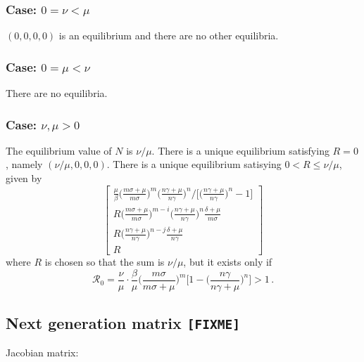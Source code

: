 \documentclass[fleqn]{article}
\begin{document}
\subsubsection{Case: $0 = \nu < \mu$}

$(0, 0, 0, 0)$ is an equilibrium and there are no other equilibria.

\subsubsection{Case: $0 = \mu < \nu$}

There are no equilibria.

\subsubsection{Case: $\nu, \mu > 0$}

The equilibrium value of $N$ is $\nu / \mu$.
There is a unique equilibrium satisfying $R = 0$,
namely $(\nu / \mu, 0, 0, 0)$.
There is a unique equilibrium satisying $0 < R \leq \nu / \mu$, given by
\begin{equation}
\begin{bmatrix}
  \left.\frac{\mu}{\beta} \big(\frac{m \sigma + \mu}{m \sigma}\big)^{m} \big(\frac{n \gamma + \mu}{n \gamma}\big)^{n} \big/ \big[\big(\frac{n \gamma + \mu}{n \gamma}\big)^{n} - 1\big]\right. \\
  R \big(\frac{m \sigma + \mu}{m \sigma}\big)^{m - i} \big(\frac{n \gamma + \mu}{n \gamma}\big)^{n} \frac{\delta + \mu}{m \sigma} \\
  R \big(\frac{n \gamma + \mu}{n \gamma}\big)^{n - j} \frac{\delta + \mu}{n \gamma} \\
  R
\end{bmatrix}
\end{equation}
where $R$ is chosen so that the sum is $\nu / \mu$, but it exists only if
\begin{equation}
\mathcal{R}_{0} = \frac{\nu}{\mu} \cdot \frac{\beta}{\mu} \Big(\frac{m \sigma}{m \sigma + \mu}\Big)^{m} \Big[1 - \Big(\frac{n \gamma}{n \gamma + \mu}\Big)^{n}\Big] > 1\,.
\end{equation}


\subsection{Next generation matrix \texttt{[FIXME]}}

Jacobian matrix:
\end{document}
